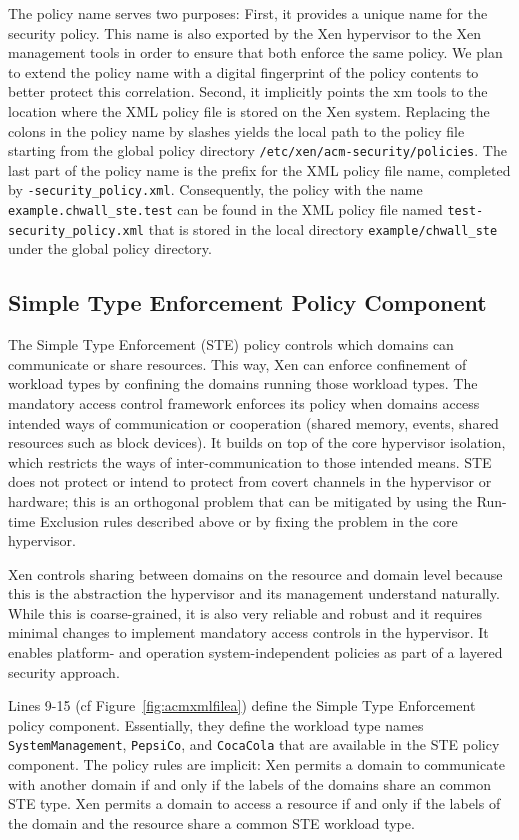 \documentclass[11pt,twoside,final,openright]{report}
\begin{document}
The policy name serves two purposes: First, it provides a unique name
for the security policy. This name is also exported by the Xen
hypervisor to the Xen management tools in order to ensure that both
enforce the same policy. We plan to extend the policy name with a
digital fingerprint of the policy contents to better protect this
correlation.  Second, it implicitly points the xm tools to the
location where the XML policy file is stored on the Xen system.
Replacing the colons in the policy name by slashes yields the local
path to the policy file starting from the global policy directory
\verb|/etc/xen/acm-security/policies|. The last part of the policy
name is the prefix for the XML policy file name, completed by
\verb|-security_policy.xml|. Consequently, the policy with the name
\verb|example.chwall_ste.test| can be found in the XML policy file
named \verb|test-security_policy.xml| that is stored in the local
directory \verb|example/chwall_ste| under the global policy directory.

\subsection{Simple Type Enforcement Policy Component}

The Simple Type Enforcement (STE) policy controls which domains can
communicate or share resources. This way, Xen can enforce confinement
of workload types by confining the domains running those workload
types. The mandatory access control framework enforces its policy when
domains access intended ways of communication or cooperation (shared
memory, events, shared resources such as block devices). It builds on
top of the core hypervisor isolation, which restricts the ways of
inter-communication to those intended means.  STE does not protect or
intend to protect from covert channels in the hypervisor or hardware;
this is an orthogonal problem that can be mitigated by using the
Run-time Exclusion rules described above or by fixing the problem in
the core hypervisor.

Xen controls sharing between domains on the resource and domain level
because this is the abstraction the hypervisor and its management
understand naturally. While this is coarse-grained, it is also very
reliable and robust and it requires minimal changes to implement
mandatory access controls in the hypervisor. It enables platform- and
operation system-independent policies as part of a layered security
approach.

Lines 9-15 (cf Figure~\ref{fig:acmxmlfilea}) define the Simple Type
Enforcement policy component.  Essentially, they define the workload
type names \verb|SystemManagement|, \verb|PepsiCo|, and
\verb|CocaCola| that are available in the STE policy component. The
policy rules are implicit: Xen permits a domain to communicate with
another domain if and only if the labels of the domains share an
common STE type.  Xen permits a domain to access a resource if and
only if the labels of the domain and the resource share a common STE
workload type.
\end{document}
